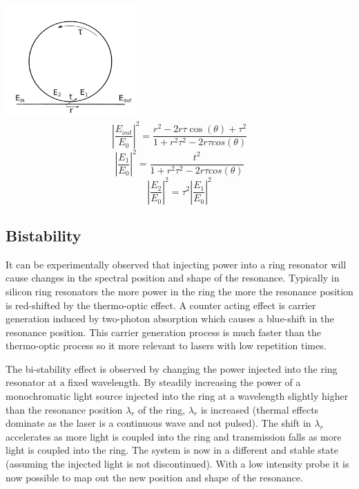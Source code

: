 \begingroup
\centering
    \includegraphics[width=5cm]{img/theory/ring.pdf}
\endgroup
\begin{equation}
\left |\frac{E_{out}}{E_{0}}\right|^2=\frac{r^2-2r\tau\cos(\theta)+\tau^2}{1+r^2\tau^2-2r\tau cos(\theta)}
\end{equation}
\begin{equation}
\left|\frac{E_{1}}{E_{0}}\right |^2=\frac{t^2}{1+r^2\tau^2-2r\tau cos(\theta)}
\end{equation}
\begin{equation}
\left |\frac{E_{2}}{E_{0}}\right |^2=\tau^2\left|\frac{E_{1}}{E_{0}}\right |^2
\end{equation}

\subsection{Bistability}
It can be experimentally observed that injecting power into a ring resonator will cause changes in the spectral position and shape of the resonance. Typically in silicon ring resonators the more power in the ring the more the resonance position is red-shifted by the thermo-optic effect\cite{almeida_optical_2004-1}. A counter acting effect is carrier generation induced by two-photon absorption \cite{xu_carrier-induced_2006} which causes a blue-shift in the resonance position. This carrier generation process is much faster than the thermo-optic process so it more relevant to lasers with low repetition times. 

The bi-stability effect is observed by changing the power injected into the ring resonator at a fixed wavelength. By steadily increasing the power of a monochromatic light source injected into the ring at a wavelength slightly higher than the resonance position $\lambda_{r}$ of the ring, $\lambda_{r}$ is increased (thermal effects dominate as the laser is a continuous wave and not pulsed). The shift in $\lambda_{r}$ accelerates as more light is coupled into the ring and transmission falls as more light is coupled into the ring. The system is now in a different and stable state (assuming the injected light is not discontinued). With a low intensity probe it is now possible to map out the new position and shape of the resonance.

